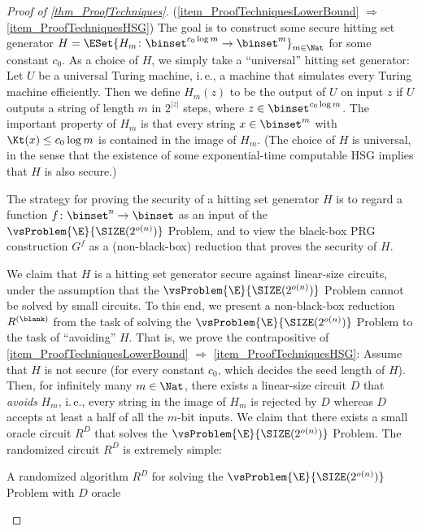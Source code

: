 \documentclass[11pt]{article}
\numberwithin{equation}{section}
\theoremstyle{definition}
\theoremstyle{plain}
\newcommand{\ie}{i.\,e.}
\begin{document}
\begin{proof}
  [Proof of \cref{thm_ProofTechniques}]
  (\cref{item_ProofTechniquesLowerBound} $\Rightarrow$ \ref{item_ProofTechniquesHSG})
  The goal is to construct some secure hitting set generator
  $H = \ESet{ H_m \colon \allowbreak \binset^{c_0 \log m} \to \binset^m }_{m \in \Nat}$
  for some constant $c_0$.
  As a choice of $H$, we simply take
  a ``universal'' hitting set generator:
  Let $U$ be a universal Turing machine, \ie, a machine that simulates every Turing machine efficiently.
  Then we define $H_m(z)$ to be the output of $U$ on input $z$
  if $U$ outputs a string of length $m$ in $2^{|z|}$ steps, where $z \in \binset^{c_0 \log m}$.
  The important property of $H_m$ is that
  every string $x \in \binset^m$
  with $\Kt(x) \le c_0 \log m$ is contained in the image of $H_m$.
  (The choice of $H$ is universal, in the sense that
  the existence of some exponential-time computable HSG
  implies that $H$ is also secure.)

  The strategy for proving the security of a hitting set generator $H$
  is to regard a function $f \colon \binset^n \to \binset$ as an input of the $\vsProblem{\E}{\SIZE(2^{o(n)})}$ Problem,
  and
  to view the black-box PRG construction $G^f$
  as a (non-black-box) reduction that proves the security of $H$.

  We claim that $H$ is a hitting set generator
  secure against linear-size circuits,
  under the assumption
  that
  the $\vsProblem{\E}{\SIZE(2^{o(n)})}$ Problem cannot be solved
  by small circuits.
  To this end, we present a non-black-box reduction $R^{(\blank)}$ from
  the task of solving the $\vsProblem{\E}{\SIZE(2^{o(n)})}$ Problem
  to the task of ``avoiding'' $H$.
  That is, we prove the contrapositive of \cref{item_ProofTechniquesLowerBound} $\Rightarrow$ \ref{item_ProofTechniquesHSG}:
  Assume that $H$ is not secure (for every constant $c_0$, which decides the seed length of $H$).
  Then,
  for infinitely many $m \in \Nat$,
  there exists a linear-size circuit $D$ that \emph{avoids} $H_m$, \ie,
  every string in the image of $H_m$ is rejected by $D$ whereas $D$ accepts at least a half of all the $m$-bit inputs.
  We claim that there exists a small oracle circuit $R^D$ that solves
  the $\vsProblem{\E}{\SIZE(2^{o(n)})}$ Problem.
  The randomized circuit $R^D$ is extremely simple:
  \begin{description}
    \item[
          A randomized algorithm $R^D$ for solving the $\vsProblem{\E}{\SIZE(2^{o(n)})}$ Problem
          with $D$ oracle]
          \hspace{0em}


\end{description}
\end{proof}
\end{document}
